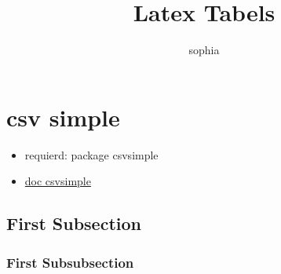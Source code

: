 \documentclass[10pt]{article}
\title{Latex Tabels}
\date{}
\author{sophia}
\begin{document}
 
\maketitle
\tableofcontents
 
\section{csv simple}
\begin{itemize}
    \item requierd: package csvsimple
    \item \href{https://mirror.dogado.de/tex-archive/macros/latex/contrib/csvsimple/csvsimple.pdf}{doc csvsimple}
\end{itemize}
\subsection{First Subsection}
\subsubsection{First Subsubsection}
 
\end{document}
